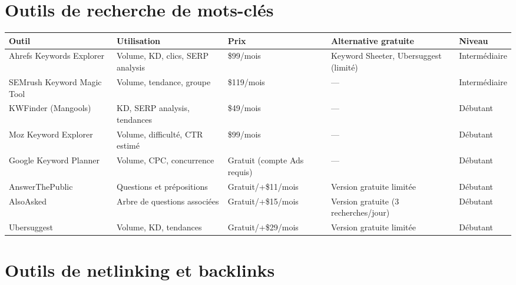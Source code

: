 \documentclass[12pt,a4paper,twoside]{report}
\begin{document}
\section*{Outils de recherche de mots-clés}

\begin{center}
\begin{tabularx}{\textwidth}{|p{3cm}|X|p{2cm}|p{2.5cm}|p{1.8cm}|}
\hline
\textbf{Outil} & \textbf{Utilisation} & \textbf{Prix} & \textbf{Alternative gratuite} & \textbf{Niveau} \\
\hline
Ahrefs Keywords Explorer & Volume, KD, clics, SERP analysis & \$99/mois & Keyword Sheeter, Ubersuggest (limité) & Intermédiaire \\
\hline
SEMrush Keyword Magic Tool & Volume, tendance, groupe & \$119/mois & — & Intermédiaire \\
\hline
KWFinder (Mangools) & KD, SERP analysis, tendances & \$49/mois & — & Débutant \\
\hline
Moz Keyword Explorer & Volume, difficulté, CTR estimé & \$99/mois & — & Débutant \\
\hline
Google Keyword Planner & Volume, CPC, concurrence & Gratuit (compte Ads requis) & — & Débutant \\
\hline
AnswerThePublic & Questions et prépositions & Gratuit/+\$11/mois & Version gratuite limitée & Débutant \\
\hline
AlsoAsked & Arbre de questions associées & Gratuit/+\$15/mois & Version gratuite (3 recherches/jour) & Débutant \\
\hline
Ubersuggest & Volume, KD, tendances & Gratuit/+\$29/mois & Version gratuite limitée & Débutant \\
\hline
\bottomrule
\end{tabularx}
\end{center}

\section*{Outils de netlinking et backlinks}
\end{document}
